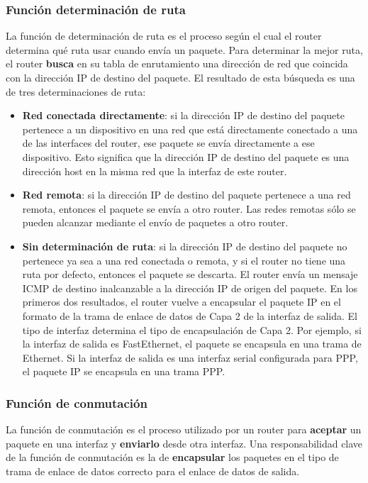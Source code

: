 \documentclass[
	12pt, %
	fleqn, %
	a4paper, %
	oneside, %
]{LegrandOrangeBook}
\begin{document}
\subsubsection{Función determinación de ruta}
La función de determinación de ruta es el proceso según el cual el router determina qué ruta usar cuando envía un paquete. Para determinar la mejor ruta, el router \textbf{busca} en su tabla de enrutamiento una dirección de red que coincida con la dirección IP de destino del paquete. El resultado de esta búsqueda es una de tres determinaciones de ruta:
\begin{itemize}
\item \textbf{Red conectada directamente}: si la dirección IP de destino del paquete pertenece a un dispositivo en una red que está directamente conectado a una de las interfaces del router, ese paquete se envía directamente a ese dispositivo. Esto significa que la dirección IP de destino del paquete es una dirección host en la misma red que la interfaz de este router.
\item \textbf{Red remota}: si la dirección IP de destino del paquete pertenece a una red remota, entonces el paquete se envía a otro router. Las redes remotas sólo se pueden alcanzar mediante el envío de paquetes a otro router.
\item \textbf{Sin determinación de ruta}: si la dirección IP de destino del paquete no pertenece ya sea a una red conectada o remota, y si el router no tiene una ruta por defecto, entonces el paquete se descarta. El router envía un mensaje ICMP de destino inalcanzable a la dirección IP de origen del paquete. En los primeros dos resultados, el router vuelve a encapsular el paquete IP en el formato de la trama de enlace de datos de Capa 2 de la interfaz de salida. El tipo de interfaz determina el tipo de encapsulación de Capa 2. Por ejemplo, si la interfaz de salida es FastEthernet, el paquete se encapsula en una trama de Ethernet. Si la interfaz de salida es una interfaz serial configurada para PPP, el paquete IP se encapsula en una trama PPP.
\end{itemize}
\subsubsection{Función de conmutación}
La función de conmutación es el proceso utilizado por un router para \textbf{aceptar} un paquete en una interfaz y \textbf{enviarlo} desde otra interfaz. Una responsabilidad clave de la función de conmutación es la de \textbf{encapsular} los paquetes en el tipo de trama de enlace de datos correcto para el enlace de datos de salida.
\end{document}

